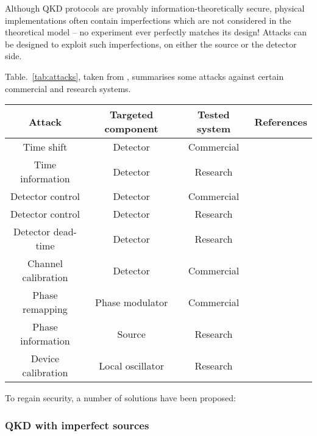 Although QKD protocols are provably information-theoretically secure, physical implementations often contain imperfections which are not considered in the theoretical model -- no experiment ever perfectly matches its design! Attacks can be designed to exploit such imperfections, on either the source or the detector side.

Table.~\ref{tab:attacks}, taken from \cite{bib:lo2014secure}, summarises some attacks against certain commercial and research systems.

\startnormtable
\begin{table*}[!htbp]
\begin{tabular}{|c|c|c|c|} 
 \hline
 Attack &  Targeted component & Tested system & References\\ 
  \hline
  \hline
Time shift
        & Detector & Commercial & \cite{bib:qi2005time, bib:PhysRevA.78.042333, bib:PhysRevA.74.022313}\\
Time information & Detector & Research & \cite{bib:lamas2007breaking} \\
Detector control & Detector  &   Commercial & \cite{bib:lydersen2010hacking, bib:yuan2010avoiding}\\
Detector control  & Detector  & Research & \cite{bib:gerhardt2011full} \\
Detector dead-time      & Detector  & Research   & \cite{bib:weier2011quantum}      \\
Channel calibration    & Detector  &  Commercial  & \cite{bib:jain2011device}      \\
Phase remapping  &  Phase modulator & Commercial & \cite{bib:xu2010experimental} \\
Phase information & Source & Research & \cite{bib:tang2013source}          \\
Device calibration  & Local oscillator & Research & \cite{bib:jouguet2013preventing} \\
                \hline
\end{tabular}
\caption{\label{tab:attacks} Summary of various attacks against some commercial and 
research QKD systems.}
\end{table*}
\startalgtable

To regain security, a number of solutions have been proposed:

\subsubsection{QKD with imperfect sources}

